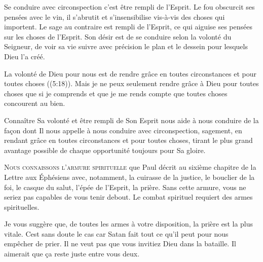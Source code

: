 
Se conduire avec circonspection c'est être rempli de l'Esprit.
 Le fou obscurcit ses pensées avec le vin, il s'abrutit et s'insensibilise
 vis-à-vis des choses qui importent. Le sage au contraire est rempli
 de l'Esprit, ce qui aiguise ses pensées sur les choses de l'Esprit.
 Son désir est de se conduire selon la volonté du Seigneur, 
 de voir sa vie suivre avec précision le plan et le dessein
 pour lesquels Dieu l'a créé.

La volonté de Dieu pour nous est de rendre grâce en toutes circonstances
 et pour toutes choses ((5:18)).
 Mais je ne peux seulement rendre grâce à Dieu pour toutes choses
 que si je comprends et que je me rends compte que toutes choses
 concourent au bien.

Connaître Sa volonté et être rempli de Son Esprit nous aide 
 à nous conduire de la façon dont Il nous appelle à nous conduire
 \ocadr avec circonspection, sagement, en rendant grâce en toutes circonstances
 et pour toutes choses, tirant le plus grand avantage possible
 de chaque opportunité \fcadr{} toujours pour Sa gloire.

\dvrule






\lettrine{N}{ous connaissons l'armure spirituelle} que Paul décrit
 au sixième chapitre de la Lettre aux Éphésiens avec, notamment,
 la cuirasse de la justice, le bouclier de la foi, le casque du salut,
 l'épée de l'Esprit, la prière. Sans cette armure,
 vous ne seriez pas capables de vous tenir debout.
 Le combat spirituel requiert des armes spirituelles.

Je vous suggère que, de toutes les armes à votre disposition,
 la prière est la plus vitale. Cest sans doute le cas car Satan
 fait tout ce qu'il peut pour nous empêcher de prier.
 Il ne veut pas que vous invitiez Dieu dans la bataille.
 Il aimerait que ça reste juste entre vous deux.

